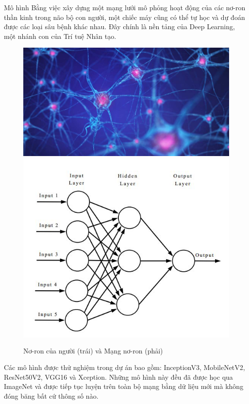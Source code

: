 \documentclass{beamer}
\begin{document}
\begin{frame}[allowframebreaks]{Mô hình}
	Bằng việc xây dựng một mạng lưới mô phỏng hoạt động của các nơ-ron thần kinh trong não bộ con người, một chiếc máy cũng có thể tự học và dự đoán được các loại sâu bệnh khác nhau. Đây chính là nền tảng của Deep Learning, một nhánh con của Trí tuệ Nhân tạo.

	\begin{figure}[H]
		\includegraphics[scale=0.5]{images/image10}
		\includegraphics[scale=0.2]{images/image15}
		\caption{Nơ-ron của người (trái) và Mạng nơ-ron (phải)}
	\end{figure}

	\framebreak

	Các mô hình được thử nghiệm trong dự án bao gồm: InceptionV3, MobileNetV2, ResNet50V2, VGG16 và Xception. Những mô hình này đều đã được học qua ImageNet và được tiếp tục luyện trên toàn bộ mạng bằng dữ liệu mới mà không đóng băng bất cứ thông số nào.


\end{frame}
\end{document}
